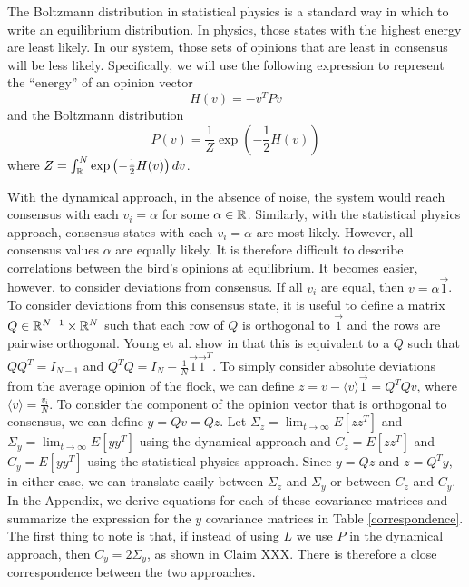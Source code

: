 \documentclass{article}
\begin{document}
The Boltzmann distribution in statistical physics is a standard way in which to write an equilibrium distribution. In physics, those states with the highest energy are least likely. In our system, those sets of opinions that are least in consensus will be less likely. Specifically, we will use the following expression to represent the ``energy'' of an opinion vector
\begin{equation}
H(v)=-v^TPv \label{Hamiltonian}
\end{equation}
and the Boltzmann distribution
\begin{equation}
P(v)=\frac{1}{Z}\exp\left(-\frac{1}{2}H(v)\right) \label{Boltzmann}
\end{equation}
where $Z=\int_{\mathbb{R}}^N\exp\left(-\frac{1}{2}H(v)\right)dv$.

With the dynamical approach, in the absence of noise, the system would reach consensus with each $v_i=\alpha$ for some $\alpha\in{\mathbb{R}}$. Similarly, with the statistical physics approach, consensus states with each $v_i=\alpha$ are most likely. However, all consensus values $\alpha$ are equally likely. It is therefore difficult to describe correlations between the bird's opinions at equilibrium. It becomes easier, however, to consider deviations from consensus. If all $v_i$ are equal, then $v=\alpha\vec{1}$. To consider deviations from this consensus state, it is useful to define a matrix $Q\in{\mathbb{R}}^{N-1}\times{\mathbb{R}}^N$ such that each row of $Q$ is orthogonal to $\vec{1}$ and the rows are pairwise orthogonal. Young et al. show in \cite{Young:2010fk,Young:2013kx} that this is equivalent to a $Q$ such that $QQ^T=I_{N-1}$ and $Q^TQ=I_N-\frac{1}{N}\vec{1}\vec{1}^T$. To simply consider absolute deviations from the average opinion of the flock, we can define $z=v-\langle v\rangle \vec{1}=Q^TQv$, where $\langle v \rangle =\frac{v_i}{N}$. To consider the component of the opinion vector that is orthogonal to consensus, we can define $y=Qv=Qz$. Let $\Sigma_z=\lim_{t\to\infty}E[zz^T]$ and $\Sigma_y=\lim_{t\to\infty}E[yy^T]$ using the dynamical approach and $C_z=E[zz^T]$ and $C_y=E[yy^T]$ using the statistical physics approach. Since $y=Qz$ and $z=Q^Ty$, in either case, we can translate easily between $\Sigma_z$ and $\Sigma_y$ or between $C_z$ and $C_y$. In the Appendix, we derive equations for each of these covariance matrices and summarize the expression for the $y$ covariance matrices in Table \ref{correspondence}.  The first thing to note is that, if instead of using $L$ we use $P$ in the dynamical approach, then $C_y=2\Sigma_y$, as shown in Claim XXX. There is therefore a close correspondence between the two approaches.
\end{document}
